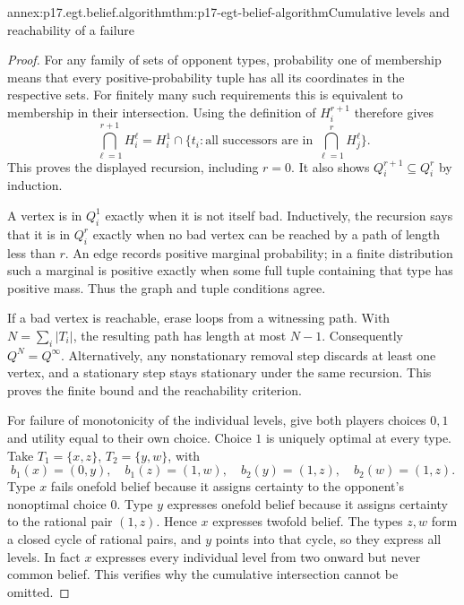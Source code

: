 \begin{annexitem}{annex:p17.egt.belief.algorithm}{thm:p17-egt-belief-algorithm}{Cumulative levels and reachability of a failure}
\begin{proof}
For any family of sets of opponent types, probability one of
membership means that every positive-probability tuple has all
its coordinates in the respective sets. For finitely many such
requirements this is equivalent to membership in their intersection.
Using the definition of \(H_i^{r+1}\) therefore gives
\[
 \bigcap_{\ell=1}^{r+1}H_i^\ell
   =H_i^1\cap\{t_i:\text{all successors are in }
                         \bigcap_{\ell=1}^{r}H_j^\ell\}.
\]
This proves the displayed recursion, including \(r=0\).
It also shows \(Q_i^{r+1}\subseteq Q_i^r\) by induction.

A vertex is in \(Q_i^1\) exactly when it is not itself bad.
Inductively, the recursion says that it is in \(Q_i^r\)
exactly when no bad vertex can be reached by a path of length
less than \(r\). An edge records positive marginal probability;
in a finite distribution such a marginal is positive exactly
when some full tuple containing that type has positive mass.
Thus the graph and tuple conditions agree.

If a bad vertex is reachable, erase loops from a witnessing path.
With \(N=\sum_i|T_i|\), the resulting path has length at most
\(N-1\). Consequently \(Q^N=Q^\infty\). Alternatively, any
nonstationary removal step discards at least one vertex, and a
stationary step stays stationary under the same recursion.
This proves the finite bound and the reachability criterion.

For failure of monotonicity of the individual levels, give both
players choices \(0,1\) and utility equal to their own choice.
Choice \(1\) is uniquely optimal at every type.
Take \(T_1=\{x,z\}\), \(T_2=\{y,w\}\), with
\[
 b_1(x)=(0,y),\quad b_1(z)=(1,w),\quad
 b_2(y)=(1,z),\quad b_2(w)=(1,z).
\]
Type \(x\) fails onefold belief because it assigns certainty to
the opponent's nonoptimal choice \(0\).
Type \(y\) expresses onefold belief because it assigns certainty
to the rational pair \((1,z)\).
Hence \(x\) expresses twofold belief. The types \(z,w\) form a
closed cycle of rational pairs, and \(y\) points into that cycle,
so they express all levels. In fact \(x\) expresses every
individual level from two onward but never common belief.
This verifies why the cumulative intersection cannot be omitted.
\end{proof}
\end{annexitem}

